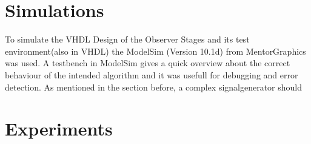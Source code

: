 %
\section{Simulations}
To simulate the VHDL Design of the Observer Stages and its test environment(also in VHDL) the ModelSim (Version 10.1d) from MentorGraphics was used.  
A testbench in ModelSim gives a quick overview about the correct behaviour of the intended algorithm and it was usefull for debugging and error detection.
As mentioned in the section before, a complex signalgenerator should 
\section{Experiments}
%
